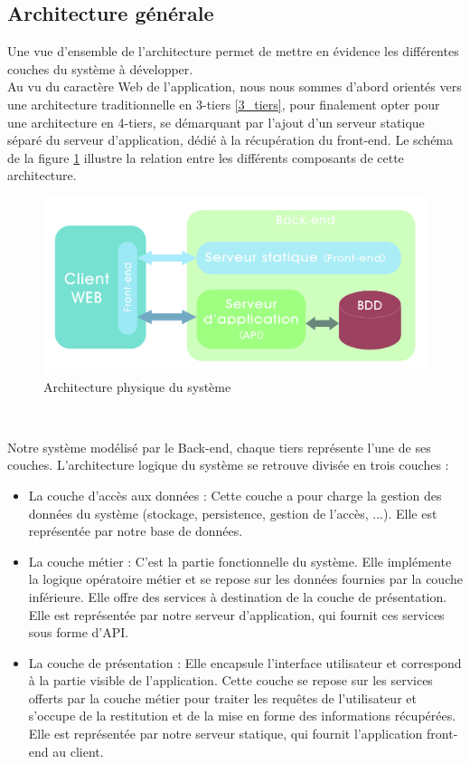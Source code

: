 \begin{spacing}{1.5}
\subsection{Architecture générale}
Une vue d'ensemble de l'architecture permet de mettre en évidence les différentes couches du système à développer.\\
Au vu du caractère Web de l'application, nous nous sommes d'abord orientés vers une architecture traditionnelle en 3-tiers \ref{3_tiers}, pour finalement opter pour une architecture en 4-tiers, se démarquant par l'ajout d'un serveur statique séparé du serveur d'application, dédié à la récupération du front-end. Le schéma de la figure \ref{fig:baseArchitecture} illustre la relation entre les différents composants de cette architecture.

\begin{figure}[h]
\centering
\includegraphics[width=1\linewidth]{baseArchitecture.jpg}
\caption{Architecture physique du système}
\label{fig:baseArchitecture}
\end{figure}
\

Notre système modélisé par le Back-end, chaque tiers représente l'une de ses couches. L'architecture logique du système se retrouve divisée en trois couches :
\begin{itemize}
    \item La couche d'accès aux données : Cette couche a pour charge la gestion des données du système (stockage, persistence, gestion de l'accès, ...). Elle est représentée par notre base de données.
    \item La couche métier : C'est la partie fonctionnelle du système. Elle implémente la logique opératoire métier et se repose sur les données fournies par la couche inférieure. Elle offre des services à destination de la couche de présentation. Elle est représentée par notre serveur d'application, qui fournit ces services sous forme d'API.
    \item La couche de présentation : Elle encapsule l'interface utilisateur et correspond à la partie visible de l'application. Cette couche se repose sur les services offerts par la couche métier pour traiter les requêtes de l'utilisateur et s'occupe de la restitution et de la mise en forme des informations récupérées. Elle est représentée par notre serveur statique, qui fournit l'application front-end au client.
\end{itemize}
\


\end{spacing}
